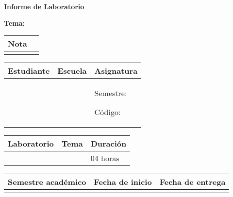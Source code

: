 
	
	\vspace*{10pt}
	
	\begin{center}	
		\fontsize{17}{17} \textbf{ Informe de Laboratorio \itemPracticeNumber}
	\end{center}
	\centerline{\textbf{\Large Tema: \itemTheme}}
	\vspace*{0.5cm}	

	\begin{flushright}
		\begin{tabular}{|M{2.5cm}|N|}
			\hline 
			\color{white} \textbf{Nota}  \\
			\hline 
			     \\[30pt]
			\hline 			
		\end{tabular}
	\end{flushright}	

	\begin{table}[H]
		\begin{tabular}{|x{4.9cm}|x{4.3cm}|x{5.1cm}|}
			\hline 
			\color{white} \textbf{Estudiante} & \color{white}\textbf{Escuela}  & \color{white}\textbf{Asignatura}   \\
			\hline 
			{\itemStudent \par \itemEmail} & \itemSchool & {\itemCourse \par Semestre: \itemSemester \par Código: \itemCourseCode}     \\
			\hline 			
		\end{tabular}
	\end{table}		
	
	\begin{table}[H]
		\begin{tabular}{|x{4.7cm}|x{4.8cm}|x{4.8cm}|}
			\hline 
			\color{white}\textbf{Laboratorio} & \color{white}\textbf{Tema}  & \color{white}\textbf{Duración}   \\
			\hline 
			\itemPracticeNumber & \itemTheme & 04 horas   \\
			\hline 
		\end{tabular}
	\end{table}
	
	\begin{table}[H]
		\begin{tabular}{|x{4.7cm}|x{4.8cm}|x{4.8cm}|}
			\hline 
			\color{white}\textbf{Semestre académico} & \color{white}\textbf{Fecha de inicio}  & \color{white}\textbf{Fecha de entrega}   \\
			\hline 
			\itemAcademic & \itemInput &  \itemOutput  \\
			\hline 
		\end{tabular}
	\end{table}

